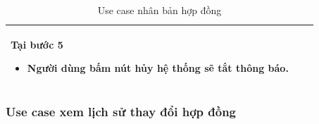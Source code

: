\documentclass[12pt,a4paper]{article}
\begin{document}
\begin{table}[H]
\begin{tabular}{|p{3.5cm}|p{11.5cm}|c|}
            Tại bước 5\newline
            \vspace{-.8cm}\begin{itemize}
                              \item Người dùng bấm nút hủy hệ thống sẽ tắt thông báo.
            \end{itemize} \\
            \hline
        \end{tabular}
        \caption{Use case nhân bản hợp đồng }

    \end{table}


    \subsubsection*{Use case xem lịch sử thay đổi hợp đồng}
\end{document}
